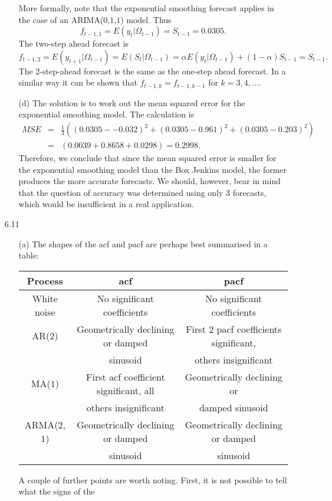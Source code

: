 \documentclass[11pt,a4paper]{article}
\begin{document}
\begin{itemize}
\begin{itemize}
More formally, note that the exponential smoothing forecast applies in the case of
an ARIMA($0$,$1$,$1$) model. Thus
$$
 f_{t-1,1} = E(y_t| \Omega_{t-1}) = S_{t-1} = 0.0305.
$$
The two-step ahead forecast is
$$
 f_{t-1,2} = E(y_{t+1}|\Omega_{t-1}) = E(S_t|\Omega_{t-1}) = \alpha E(y_t|\Omega_{t-1}) + (1-\alpha) S_{t-1} = S_{t-1}.
$$
The 2-step-ahead forecast is the same as the one-step ahead forecast.
In a similar way it can be  shown that $f_{t-1,k} = f_{t-1,k-1}$
for $k=3,4,\ldots$.
\item[(d)] The solution is to work out the mean squared error for the exponential smoothing model. The calculation is
$$
\begin{array}{rcl}
MSE & = &
\frac{1}{3} \left((0.0305 - -0.032)^2 + (0.0305 - 0.961)^2 + (0.0305 - 0.203)^2 \right) \\
& = & (0.0039 + 0.8658 + 0.0298) = 0.2998.
\end{array}
$$
Therefore, we conclude that since the mean squared error is smaller for the
exponential smoothing model than the Box Jenkins model, the former produces
the more accurate forecasts. We should, however, bear in mind that the
question of accuracy was determined using only 3 forecasts, which would be
insufficient in a real application.
\end{itemize}
\item[6.11]
\begin{itemize}
\item[(a)]
The shapes of the acf and pacf are perhaps best summarised in a table: \\
\begin{tabular}{c|cc}
\hline
Process & acf & pacf\\
\hline
White noise & No significant coefficients & No significant
coefficients \\
AR($2$) & Geometrically declining or damped & First 2 pacf coefficients
significant, \\
 & sinusoid & others insignificant \\
MA($1$) & First acf coefficient
significant, all & Geometrically declining or\\
 & others insignificant & damped sinusoid \\
ARMA($2$,$1$) & Geometrically declining or damped & Geometrically
declining or damped\\
 & sinusoid & sinusoid\\
\hline
\end{tabular}
A couple of further points are
worth noting. First, it is not possible to tell what the signs of the

\end{itemize}
\end{itemize}
\end{document}
